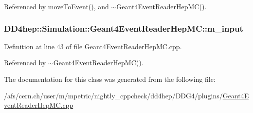 Referenced by moveToEvent(), and $\sim$Geant4EventReaderHepMC().\hypertarget{class_d_d4hep_1_1_simulation_1_1_geant4_event_reader_hep_m_c_ab5768f9462667c171c87dbb0ce830e36}{
\subsubsection[{m\_\-input}]{ {\bf DD4hep::Simulation::Geant4EventReaderHepMC::m\_\-input}}}
\label{class_d_d4hep_1_1_simulation_1_1_geant4_event_reader_hep_m_c_ab5768f9462667c171c87dbb0ce830e36}


Definition at line 43 of file Geant4EventReaderHepMC.cpp.

Referenced by $\sim$Geant4EventReaderHepMC().

The documentation for this class was generated from the following file:\begin{DoxyCompactItemize}
\item 
/afs/cern.ch/user/m/mpetric/nightly\_\-cppcheck/dd4hep/DDG4/plugins/\hyperlink{_geant4_event_reader_hep_m_c_8cpp}{Geant4EventReaderHepMC.cpp}\end{DoxyCompactItemize}
